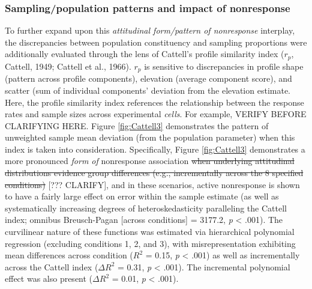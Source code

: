 \documentclass[
  man,mask]{apa7}
\begin{document}
\subsubsection{Sampling/population patterns and impact of nonresponse}\label{samplingpopulation-patterns-and-impact-of-nonresponse}

To further expand upon this \emph{attitudinal form/pattern of nonresponse} interplay, the discrepancies between population constituency and sampling proportions were additionally evaluated through the lens of Cattell's profile similarity index (\(r_p\), Cattell, 1949; Cattell et al., 1966). \(r_p\) is sensitive to discrepancies in profile shape (pattern across profile components), elevation (average component score), and scatter (sum of individual components' deviation from the elevation estimate. Here, the profile similarity index references the relationship between the response rates and sample sizes across experimental \emph{cells}. For example, VERIFY BEFORE CLARIFYING HERE. Figure \ref{fig:Cattell3} demonstrates the pattern of unweighted sample mean deviation (from the population parameter) when this index is taken into consideration. Specifically, Figure \ref{fig:Cattell3} demonstrates a more pronounced \emph{form of} nonresponse association \st{when underlying attitudinal distributions evidence group differences (e.g., incrementally across the 8 specified conditions)} {[}??? CLARIFY{]}, and in these scenarios, active nonresponse is shown to have a fairly large effect on error within the sample estimate (as well as systematically increasing degrees of heteroskedasticity paralleling the Cattell index; omnibus Breusch-Pagan {[}across conditions{]} = 3177.2, \emph{p} \textless{} .001). The curvilinear nature of these functions was estimated via hierarchical polynomial regression (excluding conditions 1, 2, and 3), with misrepresentation exhibiting mean differences across condition (\(R^2\) = 0.15, \emph{p} \textless{} .001) as well as incrementally across the Cattell index (\(\Delta{R^2}\) = 0.31, \emph{p} \textless{} .001). The incremental polynomial effect was also present (\(\Delta{R^2}\) = 0.01, \emph{p} \textless{} .001).
\end{document}
